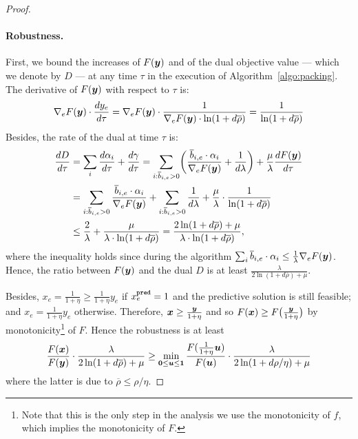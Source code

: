 \Packing*
%
\begin{proof}
\paragraph{Robustness.}
First, we bound the increases of $F(\bm{y})$ and of the dual objective value --- which we denote by $D$ --- at any time $\tau$ in the execution of 
Algorithm~\ref{algo:packing}.
The derivative of $F(\bm{y})$ with respect to $\tau$ is:
%
\begin{align*} %
\nabla_{e} F(\vect{y}) \cdot \frac{d y_{e} }{ d \tau}
= \nabla_{e} F(\vect{y}) \cdot\frac{1}{\nabla_{e} F(\vect{y}) \cdot \ln(1+ d\overline{\rho})}
= \frac{1}{\ln(1+ d\overline{\rho})}
\end{align*}
%
Besides, the rate of the dual at time $\tau$ is:
\begin{align*}
\frac{d D}{d \tau} 
&=  \sum_{i} \frac{d \alpha_{i}}{d \tau} + \frac{d \gamma}{d \tau}  
= \sum_{i: \overline{b}_{i,e}  > 0} \biggl( \frac{\overline{b}_{i,e}  \cdot \alpha_{i}}{\nabla_{e} F(\vect{y})}  + \frac{1}{d\lambda} \biggr) 
		+ \frac{\mu}{\lambda} \frac{d F(\vect{y})}{d \tau}  \\
%
&= \sum_{i: \overline{b}_{i,e}  > 0} \frac{\overline{b}_{i,e}  \cdot \alpha_{i}}{\nabla_{e} F(\vect{y})}  +  \sum_{i: \overline{b}_{i,e}  > 0} \frac{1}{d\lambda}
		+ \frac{\mu}{\lambda} \cdot \frac{1}{\ln(1+ d\overline{\rho})} \\
%
&\leq \frac{2}{\lambda} + \frac{\mu}{\lambda \cdot \ln(1+ d\overline{\rho})}
=  \frac{2\ln(1+ d\overline{\rho}) + \mu}{\lambda \cdot \ln(1+ d\overline{\rho})},
\end{align*}
where the inequality holds since during the algorithm
$\sum_{i} \overline{b}_{i,e}  \cdot \alpha_{i} \leq  \frac{1}{\lambda} \nabla_{e} F(\bm{y})$.
Hence, the ratio between $F(\bm{y})$ and the dual $D$ is at least $\frac{\lambda}{2\ln(1+ d\overline{\rho}) + \mu}$.

Besides, $x_{e} = \frac{1}{1 + \eta} \geq \frac{1}{1 + \eta} y_{e}$ if $x^{\texttt{pred}}_{e} = 1$ and the predictive solution is still feasible; and
 $x_{e} = \frac{1}{1 + \eta} y_{e}$ otherwise. Therefore, 
 $\bm{x} \geq \frac{\bm{y}}{1 + \eta} $ and so 
 $F(\bm{x}) \geq F\bigl(\frac{\bm{y}}{1 + \eta}\bigr)$ by 
 monotonicity\footnote{Note that this is the only step in the analysis we use the monotonicity of $f$, which implies the monotonicity of $F$.} 
 of $F$. 
 Hence the robustness is at least 
$$
\frac{F(\bm{x})}{F(\bm{y})} \cdot \frac{\lambda}{2\ln(1+ d\overline{\rho}) + \mu}
\geq \min_{\bm{0} \leq \bm{u} \leq \bm{1}} \frac{F(\frac{1}{1 + \eta} \bm{u})}{F(\bm{u})} \cdot \frac{\lambda}{2\ln(1+ d\rho/\eta ) + \mu} 
$$ 
where the latter is due to $\overline{\rho} \leq \rho/\eta$.


\end{proof}
